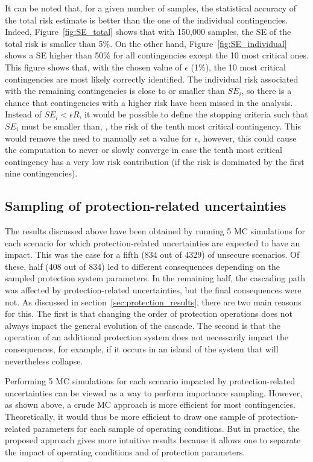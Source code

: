 It can be noted that, for a given number of samples, the statistical accuracy of the total risk estimate is better than the one of the individual contingencies. Indeed, Figure~\ref{fig:SE_total} shows that with 150,000 samples, the SE of the total risk is smaller than 5\%. On the other hand, Figure~\ref{fig:SE_individual} shows a SE higher than 50\% for all contingencies except the 10 most critical ones. This figure shows that, with the chosen value of \(\epsilon\) (1\%), the 10 most critical contingencies are most likely correctly identified. The individual risk associated with the remaining contingencies is close to or smaller than \(SE_i\), so there is a chance that contingencies with a higher risk have been missed in the analysis. Instead of \(SE_i < \epsilon R\), it would be possible to define the stopping criteria such that \(SE_i\) must be smaller than, \eg, the risk of the tenth most critical contingency. This would remove the need to manually set a value for \(\epsilon\), however, this could cause the computation to never or slowly converge in case the tenth most critical contingency has a very low risk contribution (\ie if the risk is dominated by the first nine contingencies).


\subsection{Sampling of protection-related uncertainties}
\label{sec:PDSA_results_protections}

The results discussed above have been obtained by running 5 MC simulations for each scenario for which protection-related uncertainties are expected to have an impact. This was the case for a fifth (834 out of 4329) of unsecure scenarios. Of these, half (408 out of 834) led to different consequences depending on the sampled protection system parameters. In the remaining half, the cascading path was affected by protection-related uncertainties, but the final consequences were not. As discussed in section~\ref{sec:protection_results}, there are two main reasons for this. The first is that changing the order of protection operations does not always impact the general evolution of the cascade. The second is that the operation of an additional protection system does not necessarily impact the consequences, for example, if it occurs in an island of the system that will nevertheless collapse.

Performing 5 MC simulations for each scenario impacted by protection-related uncertainties can be viewed as a way to perform importance sampling. However, as shown above, a crude MC approach is more efficient for most contingencies. Theoretically, it would thus be more efficient to draw one sample of protection-related parameters for each sample of operating conditions. But in practice, the proposed approach gives more intuitive results because it allows one to separate the impact of operating conditions and of protection parameters.

